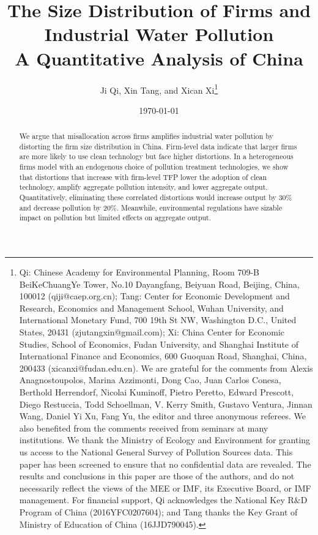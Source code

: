 \documentclass[AEJ]{AEA}
\begin{document}
\title{The Size Distribution of Firms and Industrial Water Pollution \\ A Quantitative Analysis of China}
\author{Ji Qi, Xin Tang, and Xican Xi\thanks{%
Qi: Chinese Academy for Environmental Planning, Room 709-B BeiKeChuangYe Tower, No.10 Dayangfang, Beiyuan Road, Beijing, China, 100012 (qiji@caep.org.cn); Tang: Center for Economic Development and Research, Economics and Management School, Wuhan University, and International Monetary Fund, 700 19th St NW, Washington D.C., United States, 20431 (zjutangxin@gmail.com); Xi: China Center for Economic Studies, School of Economics, Fudan University, and Shanghai Institute of International Finance and Economics, 600 Guoquan Road, Shanghai, China, 200433 (xicanxi@fudan.edu.cn). We are grateful for the comments from Alexis Anagnostoupolos, Marina Azzimonti, Dong Cao, Juan Carlos Conesa, Berthold Herrendorf, Nicolai Kuminoff, Pietro Peretto, Edward Prescott, Diego Restuccia, Todd Schoellman, V. Kerry Smith, Gustavo Ventura, Jinnan Wang, Daniel Yi Xu, Fang Yu, the editor and three anonymous referees. We also benefited from the comments received from seminars at many institutions. We thank the Ministry of Ecology and Environment for granting us access to the National General Survey of Pollution Sources data. This paper has been screened to ensure that no confidential data are revealed. The results and conclusions in this paper are those of the authors, and do not necessarily reflect the views of the MEE or IMF, its Executive Board, or IMF management. For financial support, Qi acknowledges the National Key R\&D Program of China (2016YFC0207604); and Tang thanks the Key Grant of Ministry of Education of China (16JJD790045).}}
\date{\today}

\begin{abstract}
    We argue that misallocation across firms amplifies industrial water pollution by distorting the firm size distribution in China. Firm-level data indicate that larger firms are more likely to use clean technology but face higher distortions. In a heterogeneous firms model with an endogenous choice of pollution treatment technologies, we show that distortions that increase with firm-level TFP lower the adoption of clean technology, amplify aggregate pollution intensity, and lower aggregate output. Quantitatively, eliminating these correlated distortions would increase output by 30\% and decrease pollution by 20\%. Meanwhile, environmental regulations have sizable impact on pollution but limited effects on aggregate output.
\end{abstract}
\end{document}
